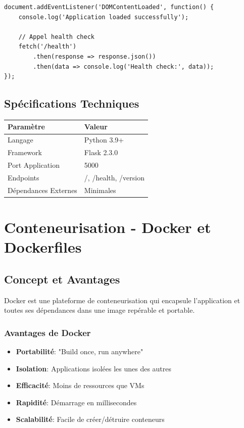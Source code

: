 \documentclass[12pt,a4paper]{report}
\begin{document}
\begin{lstlisting}
document.addEventListener('DOMContentLoaded', function() {
    console.log('Application loaded successfully');
    
    // Appel health check
    fetch('/health')
        .then(response => response.json())
        .then(data => console.log('Health check:', data));
});
\end{lstlisting}

\section{Spécifications Techniques}

\begin{table}[H]
\centering
\begin{tabularx}{\linewidth}{|l|X|}
\hline
\textbf{Paramètre} & \textbf{Valeur} \\
\hline
Langage & Python 3.9+ \\
Framework & Flask 2.3.0 \\
Port Application & 5000 \\
Endpoints & /, /health, /version \\
Dépendances Externes & Minimales \\
\hline
\end{tabularx}
\end{table}

\newpage

\chapter{Conteneurisation - Docker et Dockerfiles}

\section{Concept et Avantages}

Docker est une plateforme de conteneurisation qui encapsule l'application et toutes ses dépendances dans une image repérable et portable.

\subsection{Avantages de Docker}

\begin{itemize}
    \item \textbf{Portabilité}: "Build once, run anywhere"
    \item \textbf{Isolation}: Applications isolées les unes des autres
    \item \textbf{Efficacité}: Moins de ressources que VMs
    \item \textbf{Rapidité}: Démarrage en millisecondes
    \item \textbf{Scalabilité}: Facile de créer/détruire conteneurs
\end{itemize}
\end{document}

